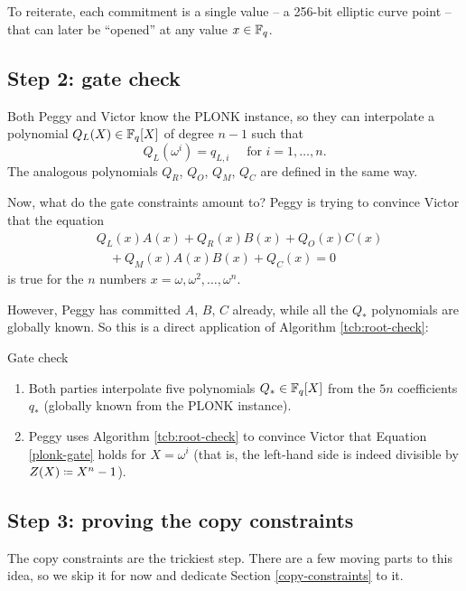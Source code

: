 To reiterate, each commitment is a single value -- a 256-bit elliptic
curve point -- that can later be ``opened'' at any value
$x \in \mathbb{F}_{q}$.

\subsection{Step 2: gate check}

Both Peggy and Victor know the PLONK instance, so they can interpolate a
polynomial $Q_{L}(X) \in \mathbb{F}_{q}[X]$ of degree
$n - 1$ such that
\[Q_{L}( \omega^{i} ) = q_{L,i}\quad\text{ for  }i = 1,\ldots,n.\]
The analogous polynomials $Q_{R}$, $Q_{O}$, $Q_{M}$, $Q_{C}$ are
defined in the same way.

Now, what do the gate constraints amount to? Peggy is trying to convince
Victor that the equation
\begin{align}
\label{plonk-gate}
& Q_{L}(x)A(x) + Q_{R}(x)B(x) + Q_{O}(x)C(x) \nonumber \\
&\quad + Q_{M}(x)A(x)B(x) + Q_{C}(x) = 0
\end{align}
is true for the $n$ numbers
$x = \omega,\omega^{2},\ldots,\omega^{n}$.

However, Peggy has committed $A$, $B$, $C$ already, while all the
$Q_{\ast}$ polynomials are globally known. So this is a direct
application of Algorithm \ref{tcb:root-check}:

\begin{algo}{Gate check}{}
\begin{enumerate}
\item
Both parties interpolate five polynomials
$Q_{\ast} \in \mathbb{F}_{q}[X]$ from the $5n$
 coefficients $q_{\ast}$ (globally known from the PLONK instance).
\item
Peggy uses Algorithm \ref{tcb:root-check} to convince Victor that
Equation \eqref{plonk-gate} holds for $X = \omega^{i}$
(that is, the left-hand side is indeed divisible by
$Z(X) \defeq X^{n} - 1$).
\end{enumerate}
\end{algo}

\subsection{Step 3: proving the copy
constraints}\label{copy-constraint-deferred}

The copy constraints are the trickiest step. There are a few moving
parts to this idea, so we skip it for now and dedicate
Section \ref{copy-constraints} to it.

